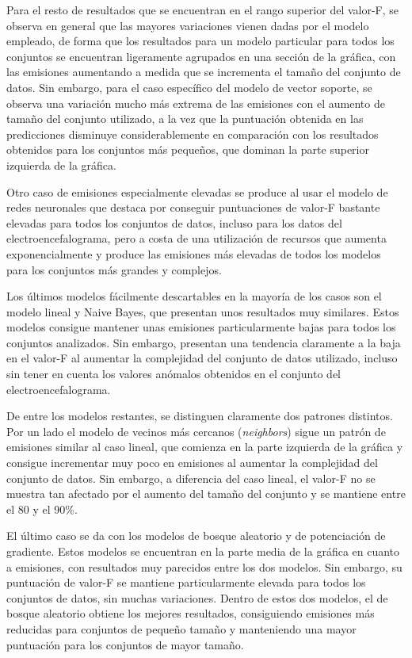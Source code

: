 Para el resto de resultados que se encuentran en el rango superior del valor-F, se observa en general que las mayores variaciones vienen dadas por el modelo empleado, de forma que los resultados para un modelo particular para todos los conjuntos se encuentran ligeramente agrupados en una sección de la gráfica, con las emisiones aumentando a medida que se incrementa el tamaño del conjunto de datos. Sin embargo, para el caso específico del modelo de vector soporte, se observa una variación mucho más extrema de las emisiones con el aumento de tamaño del conjunto utilizado, a la vez que la puntuación obtenida en las predicciones disminuye considerablemente en comparación con los resultados obtenidos para los conjuntos más pequeños, que dominan la parte superior izquierda de la gráfica.

Otro caso de emisiones especialmente elevadas se produce al usar el modelo de redes neuronales que destaca por conseguir puntuaciones de valor-F bastante elevadas para todos los conjuntos de datos, incluso para los datos del electroencefalograma, pero a costa de una utilización de recursos que aumenta exponencialmente y produce las emisiones más elevadas de todos los modelos para los conjuntos más grandes y complejos.

Los últimos modelos fácilmente descartables en la mayoría de los casos son el modelo lineal y Naive Bayes, que presentan unos resultados muy similares. Estos modelos consigue mantener unas emisiones particularmente bajas para todos los conjuntos analizados. Sin embargo, presentan una tendencia claramente a la baja en el valor-F al aumentar la complejidad del conjunto de datos utilizado, incluso sin tener en cuenta los valores anómalos obtenidos en el conjunto del electroencefalograma.

De entre los modelos restantes, se distinguen claramente dos patrones distintos. Por un lado el modelo de vecinos más cercanos (\emph{neighbors}) sigue un patrón de emisiones similar al caso lineal, que comienza en la parte izquierda de la gráfica y consigue incrementar muy poco en emisiones al aumentar la complejidad del conjunto de datos. Sin embargo, a diferencia del caso lineal, el valor-F no se muestra tan afectado por el aumento del tamaño del conjunto y se mantiene entre el 80 y el 90\%.

El último caso se da con los modelos de bosque aleatorio y de potenciación de gradiente. Estos modelos se encuentran en la parte media de la gráfica en cuanto a emisiones, con resultados muy parecidos entre los dos modelos. Sin embargo, su puntuación de valor-F se mantiene particularmente elevada para todos los conjuntos de datos, sin muchas variaciones. Dentro de estos dos modelos, el de bosque aleatorio obtiene los mejores resultados, consiguiendo emisiones más reducidas para conjuntos de pequeño tamaño y manteniendo una mayor puntuación para los conjuntos de mayor tamaño.



